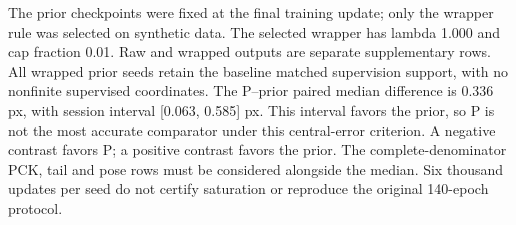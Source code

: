 The prior checkpoints were fixed at the final training update; only the wrapper rule was selected on synthetic data. The selected wrapper has lambda 1.000 and cap fraction 0.01. Raw and wrapped outputs are separate supplementary rows. All wrapped prior seeds retain the baseline matched supervision support, with no nonfinite supervised coordinates. The P--prior paired median difference is 0.336 px, with session interval [0.063, 0.585] px. This interval favors the prior, so P is not the most accurate comparator under this central-error criterion. A negative contrast favors P; a positive contrast favors the prior. The complete-denominator PCK, tail and pose rows must be considered alongside the median. Six thousand updates per seed do not certify saturation or reproduce the original 140-epoch protocol.
